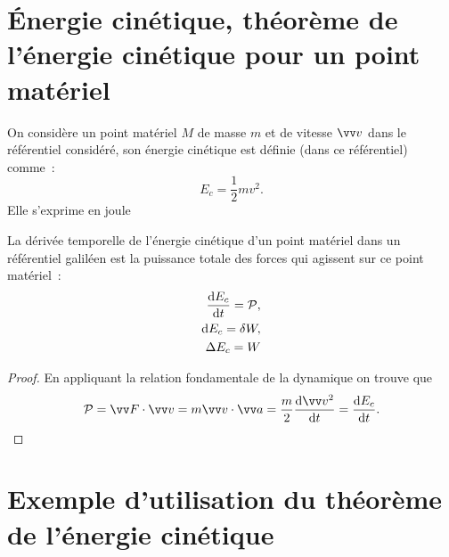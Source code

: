 \section{Énergie cinétique, théorème de l'énergie cinétique pour un point matériel}
\label{chap4-sec:ernergiecinetique}

\begin{defdef}
  On considère un point matériel \(M\) de masse \(m\) et de vitesse \(\vvv\) dans le référentiel considéré, son énergie cinétique est définie (dans ce référentiel) comme~:
  \begin{equation}
    E_c = \frac{1}{2} m v^2.
  \end{equation}
  Elle s'exprime en joule
\end{defdef}
\begin{theo}
  La dérivée temporelle de l'énergie cinétique d'un point matériel dans un référentiel galiléen est la puissance totale des forces qui agissent sur ce point matériel~:
  \begin{align}
    \dfrac{\mathrm{d} E_c}{\mathrm{d} t} = \mathcal{P}, \\
    \mathop{}\mathopen{}\mathrm{d} E_c = \delta W, \\
    \Delta E_c = W
  \end{align}
\end{theo}
\begin{proof}
  En appliquant la relation fondamentale de la dynamique on trouve que
  \begin{equation}
    \P = \vF \cdot \vvv = m \vvv \cdot \va = \frac{m}{2} \derived{\vvv^2}{t} = \derived{E_c}{t}.
  \end{equation}
\end{proof}

\section{Exemple d'utilisation du théorème de l'énergie cinétique}
\label{chap4-sec:exempletheoremeenergiecinetique}


